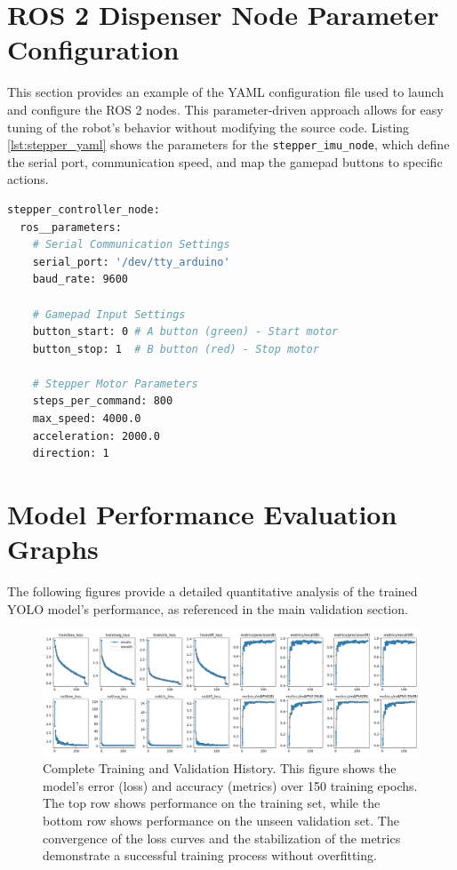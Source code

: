 \section{ROS 2 Dispenser Node Parameter Configuration}
\label{sec:appendix_yaml}
This section provides an example of the YAML configuration file used to launch and configure the ROS 2 nodes. This parameter-driven approach allows for easy tuning of the robot's behavior without modifying the source code. Listing \ref{lst:stepper_yaml} shows the parameters for the \texttt{stepper\_imu\_node}, which define the serial port, communication speed, and map the gamepad buttons to specific actions.


\begin{lstlisting}[language=bash, caption={YAML parameter file for the dispenser node (\texttt{stepper\_config.yaml}).}, label={lst:stepper_yaml}]
stepper_controller_node:
  ros__parameters:
    # Serial Communication Settings
    serial_port: '/dev/tty_arduino'
    baud_rate: 9600
    
    # Gamepad Input Settings  
    button_start: 0 # A button (green) - Start motor
    button_stop: 1  # B button (red) - Stop motor
    
    # Stepper Motor Parameters
    steps_per_command: 800
    max_speed: 4000.0
    acceleration: 2000.0
    direction: 1
\end{lstlisting}

\section{Model Performance Evaluation Graphs}
\label{sec:appendix_model_graphs}

The following figures provide a detailed quantitative analysis of the trained YOLO model's performance, as referenced in the main validation section.

\begin{figure}[h!]
    \centering
    \includegraphics[width=\textwidth]{figures/results.png} 
    \caption[Complete Training and Validation History.] 
    {Complete Training and Validation History. This figure shows the model's error (loss) and accuracy (metrics) over 150 training epochs. The top row shows performance on the training set, while the bottom row shows performance on the unseen validation set. The convergence of the loss curves and the stabilization of the metrics demonstrate a successful training process without overfitting.} 
    \label{fig:training_history_appendix}
\end{figure}

